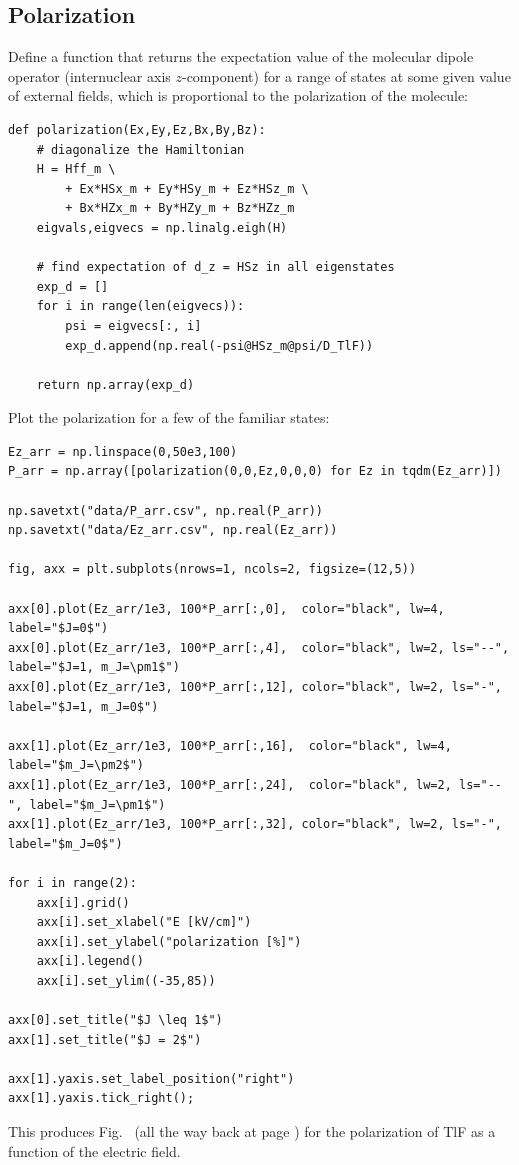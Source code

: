 \subsection{Polarization}

Define a function that returns the expectation value of the molecular dipole
operator (internuclear axis $z$-component) for a range of states at some given
value of external fields, which is proportional to the polarization of the
molecule:

\begin{lstlisting}
def polarization(Ex,Ey,Ez,Bx,By,Bz):
    # diagonalize the Hamiltonian
    H = Hff_m \
        + Ex*HSx_m + Ey*HSy_m + Ez*HSz_m \
        + Bx*HZx_m + By*HZy_m + Bz*HZz_m
    eigvals,eigvecs = np.linalg.eigh(H)
    
    # find expectation of d_z = HSz in all eigenstates
    exp_d = []
    for i in range(len(eigvecs)):
        psi = eigvecs[:, i]
        exp_d.append(np.real(-psi@HSz_m@psi/D_TlF))
    
    return np.array(exp_d)
\end{lstlisting}

Plot the polarization for a few of the familiar states:

\begin{lstlisting}
Ez_arr = np.linspace(0,50e3,100)
P_arr = np.array([polarization(0,0,Ez,0,0,0) for Ez in tqdm(Ez_arr)])

np.savetxt("data/P_arr.csv", np.real(P_arr))
np.savetxt("data/Ez_arr.csv", np.real(Ez_arr))

fig, axx = plt.subplots(nrows=1, ncols=2, figsize=(12,5))

axx[0].plot(Ez_arr/1e3, 100*P_arr[:,0],  color="black", lw=4, label="$J=0$")
axx[0].plot(Ez_arr/1e3, 100*P_arr[:,4],  color="black", lw=2, ls="--", label="$J=1, m_J=\pm1$")
axx[0].plot(Ez_arr/1e3, 100*P_arr[:,12], color="black", lw=2, ls="-", label="$J=1, m_J=0$")

axx[1].plot(Ez_arr/1e3, 100*P_arr[:,16],  color="black", lw=4, label="$m_J=\pm2$")
axx[1].plot(Ez_arr/1e3, 100*P_arr[:,24],  color="black", lw=2, ls="--", label="$m_J=\pm1$")
axx[1].plot(Ez_arr/1e3, 100*P_arr[:,32], color="black", lw=2, ls="-", label="$m_J=0$")
 
for i in range(2):
    axx[i].grid()
    axx[i].set_xlabel("E [kV/cm]")
    axx[i].set_ylabel("polarization [%]")
    axx[i].legend()
    axx[i].set_ylim((-35,85))
    
axx[0].set_title("$J \leq 1$")
axx[1].set_title("$J = 2$")

axx[1].yaxis.set_label_position("right")
axx[1].yaxis.tick_right();
\end{lstlisting}

This produces Fig.~ (all the way back at page
\pageref{polarizeTlF}) for the polarization of TlF as a function of the electric
field.
